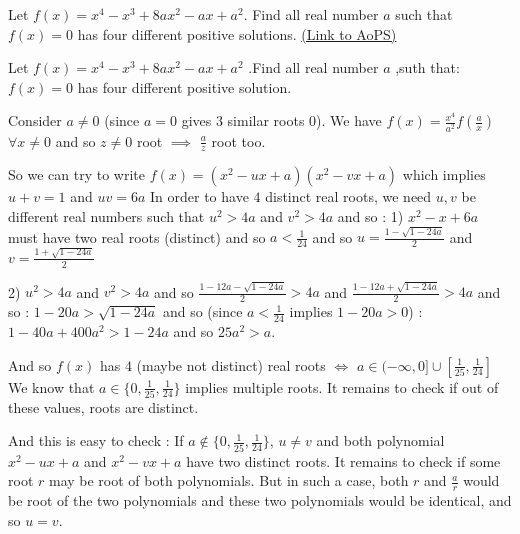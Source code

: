 \begin{problem}
	Let $ f(x)=x^4-x^3+8ax^2-ax+a^2$. Find all real number $ a$ such that $f(x)=0$ has four different positive solutions.
	\flushright \href{https://artofproblemsolving.com/community/c6h282819}{(Link to AoPS)}
\end{problem}



\begin{solution}
	\begin{tcolorbox}Let $ f(x) = x^4 - x^3 + 8ax^2 - ax + a^2$ .Find all real number $ a$ ,suth that: $ f(x) = 0$ has four different positive solution.\end{tcolorbox}

Consider $ a\neq 0$ (since $ a = 0$ gives $ 3$ similar roots $ 0$).
We have $ f(x) = \frac {x^4}{a^2}f(\frac ax)$ $ \forall x\neq 0$ and so $ z\neq 0$ root $ \implies$ $ \frac az$ root too.

So we can try to write $ f(x) = (x^2 - ux + a)(x^2 - vx + a)$ which implies $ u + v = 1$ and $ uv = 6a$
In order to have $ 4$ distinct real roots, we need $ u,v$ be different real numbers such that $ u^2 > 4a$ and $ v^2 > 4a$  and so :
1) $ x^2 - x + 6a$ must have two real roots (distinct) and so $ a < \frac {1}{24}$ and so $ u = \frac {1 - \sqrt {1 - 24a}}{2}$ and $ v = \frac {1 + \sqrt {1 - 24a}}{2}$

2) $ u^2 > 4a$ and $ v^2 > 4a$ and so $ \frac {1 - 12a - \sqrt {1 - 24a}}{2} > 4a$ and $ \frac {1 - 12a + \sqrt {1 - 24a}}{2} > 4a$ and so :
$ 1 - 20a > \sqrt {1 - 24a}$ and so (since $ a < \frac {1}{24}$ implies $ 1 - 20a > 0$) : $ 1 - 40a + 400a^2 > 1 - 24a$ and so $ 25a^2 > a$.

And so $ f(x)$ has $ 4$ (maybe not distinct) real roots $ \iff$ $ a\in( - \infty,0]\cup[\frac {1}{25},\frac {1}{24}]$
We know that $ a\in\{0,\frac {1}{25},\frac {1}{24}\}$ implies multiple roots. It remains to check if out of these values, roots are distinct.

And this is easy to check :
If $ a\notin\{0,\frac {1}{25},\frac {1}{24}\}$, $ u\neq v$ and both polynomial $ x^2 - ux + a$ and $ x^2 - vx + a$ have two distinct roots. It remains to check if some root $ r$ may be root of both polynomials. But in such a case, both $ r$ and $ \frac ar$ would be root of the two polynomials and these two polynomials would be identical, and so $ u = v$.


\end{solution}
